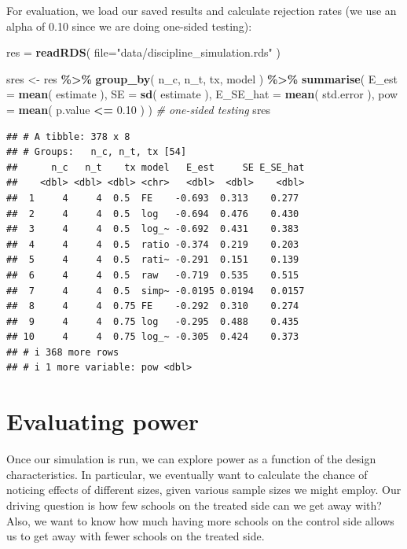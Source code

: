 \documentclass[
]{book}
\newenvironment{Shaded}{\begin{snugshade}}{\end{snugshade}}
\newcommand{\AttributeTok}[1]{\textcolor[rgb]{0.13,0.29,0.53}{#1}}
\newcommand{\CommentTok}[1]{\textcolor[rgb]{0.56,0.35,0.01}{\textit{#1}}}
\newcommand{\FloatTok}[1]{\textcolor[rgb]{0.00,0.00,0.81}{#1}}
\newcommand{\FunctionTok}[1]{\textcolor[rgb]{0.13,0.29,0.53}{\textbf{#1}}}
\newcommand{\NormalTok}[1]{#1}
\newcommand{\OtherTok}[1]{\textcolor[rgb]{0.56,0.35,0.01}{#1}}
\newcommand{\SpecialCharTok}[1]{\textcolor[rgb]{0.81,0.36,0.00}{\textbf{#1}}}
\newcommand{\StringTok}[1]{\textcolor[rgb]{0.31,0.60,0.02}{#1}}
\begin{document}
For evaluation, we load our saved results and calculate rejection rates (we use an alpha of 0.10 since we are doing one-sided testing):

\begin{Shaded}
\begin{Highlighting}[]
\NormalTok{res }\OtherTok{=} \FunctionTok{readRDS}\NormalTok{( }\AttributeTok{file=}\StringTok{"data/discipline\_simulation.rds"}\NormalTok{ )}

\NormalTok{sres }\OtherTok{\textless{}{-}}\NormalTok{ res }\SpecialCharTok{\%\textgreater{}\%} \FunctionTok{group\_by}\NormalTok{( n\_c, n\_t, tx, model ) }\SpecialCharTok{\%\textgreater{}\%}
    \FunctionTok{summarise}\NormalTok{( }\AttributeTok{E\_est =} \FunctionTok{mean}\NormalTok{( estimate ),}
               \AttributeTok{SE =} \FunctionTok{sd}\NormalTok{( estimate ),}
               \AttributeTok{E\_SE\_hat =} \FunctionTok{mean}\NormalTok{( std.error ),}
               \AttributeTok{pow =} \FunctionTok{mean}\NormalTok{( p.value }\SpecialCharTok{\textless{}=} \FloatTok{0.10}\NormalTok{ ) ) }\CommentTok{\# one{-}sided testing}
\NormalTok{sres}
\end{Highlighting}
\end{Shaded}

\begin{verbatim}
## # A tibble: 378 x 8
## # Groups:   n_c, n_t, tx [54]
##      n_c   n_t    tx model   E_est     SE E_SE_hat
##    <dbl> <dbl> <dbl> <chr>   <dbl>  <dbl>    <dbl>
##  1     4     4  0.5  FE    -0.693  0.313    0.277 
##  2     4     4  0.5  log   -0.694  0.476    0.430 
##  3     4     4  0.5  log_~ -0.692  0.431    0.383 
##  4     4     4  0.5  ratio -0.374  0.219    0.203 
##  5     4     4  0.5  rati~ -0.291  0.151    0.139 
##  6     4     4  0.5  raw   -0.719  0.535    0.515 
##  7     4     4  0.5  simp~ -0.0195 0.0194   0.0157
##  8     4     4  0.75 FE    -0.292  0.310    0.274 
##  9     4     4  0.75 log   -0.295  0.488    0.435 
## 10     4     4  0.75 log_~ -0.305  0.424    0.373 
## # i 368 more rows
## # i 1 more variable: pow <dbl>
\end{verbatim}

\section{Evaluating power}\label{evaluating-power}

Once our simulation is run, we can explore power as a function of the design characteristics.
In particular, we eventually want to calculate the chance of noticing effects of different sizes, given various sample sizes we might employ.
Our driving question is how few schools on the treated side can we get away with?
Also, we want to know how much having more schools on the control side allows us to get away with fewer schools on the treated side.
\end{document}
